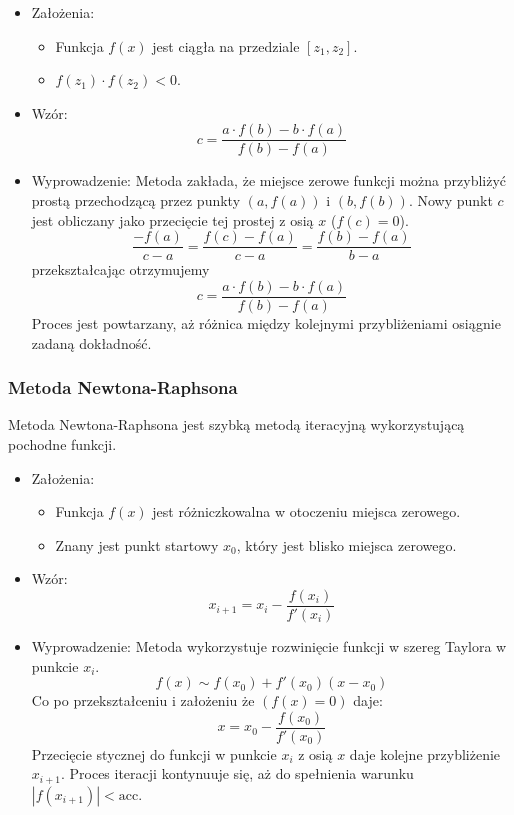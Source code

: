 \begin{itemize}
    \item Założenia:
    \begin{itemize}
        \item Funkcja \( f(x) \) jest ciągła na przedziale \([z_1, z_2]\).
        \item \( f(z_1) \cdot f(z_2) < 0 \).
    \end{itemize}
    \item Wzór:
    \[ c = \frac{a \cdot f(b) - b \cdot f(a)}{f(b) - f(a)} \]
    \item Wyprowadzenie:
    Metoda zakłada, że miejsce zerowe funkcji można przybliżyć prostą przechodzącą przez punkty \((a, f(a))\) i \((b, f(b))\). Nowy punkt \( c \) jest obliczany jako przecięcie tej prostej z osią \( x \) ($f(c) = 0$).
    \[
     \frac{-f(a)}{c-a} = \frac{f(c) - f(a)}{c-a} = \frac{f(b) - f(a)}{b-a}
    \]
    przekształcając otrzymujemy
    \[ c = \frac{a \cdot f(b) - b \cdot f(a)}{f(b) - f(a)} \]
    Proces jest powtarzany, aż różnica między kolejnymi przybliżeniami osiągnie zadaną dokładność.
\end{itemize}

\subsubsection{Metoda Newtona-Raphsona}
Metoda Newtona-Raphsona jest szybką metodą iteracyjną wykorzystującą pochodne funkcji.

\begin{itemize}
    \item Założenia:
    \begin{itemize}
        \item Funkcja \( f(x) \) jest różniczkowalna w otoczeniu miejsca zerowego.
        \item Znany jest punkt startowy \( x_0 \), który jest blisko miejsca zerowego.
    \end{itemize}
    \item Wzór:
    \[ x_{i+1} = x_i - \frac{f(x_i)}{f'(x_i)} \]
    \item Wyprowadzenie:
    Metoda wykorzystuje rozwinięcie funkcji w szereg Taylora w punkcie \( x_i \). 
    \[
    f(x) \sim f(x_0) + f'(x_0)(x - x_0) 
    \]
    Co po przekształceniu i założeniu że $(f(x) = 0)$ daje:
    \[
    x = x_0 - \frac{f(x_0)}{f'(x_0)}
    \]
    Przecięcie stycznej do funkcji w punkcie \( x_i \) z osią \( x \) daje kolejne przybliżenie \( x_{i+1} \). Proces iteracji kontynuuje się, aż do spełnienia warunku \( |f(x_{i+1})| < \text{acc} \).
\end{itemize}

